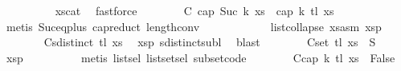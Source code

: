 \begin{isabellebody}
\ \ \ \ \ \ \ \ \isamarkupfalse%
\ xs{\isacharunderscore}{\kern0pt}cat\ \isamarkupfalse%
\ fastforce\isanewline
\ \ \ \ \ \ \isamarkupfalse%
\ C{}{\isacharcolon}{\kern0pt}\ {\isachardoublequoteopen}cap\ {\isacharparenleft}{\kern0pt}Suc\ {\isacharparenleft}{\kern0pt}k{\isacharplus}{\kern0pt}{}{\isacharparenright}{\kern0pt}{\isacharparenright}{\kern0pt}\ xs{}\ {\isasymLongrightarrow}\ cap\ {\isacharparenleft}{\kern0pt}k{\isacharplus}{\kern0pt}{}{\isacharparenright}{\kern0pt}\ {\isacharparenleft}{\kern0pt}tl\ xs{}{\isacharparenright}{\kern0pt}{\isachardoublequoteclose}\isanewline
\ \ \ \ \ \ \ \ \isamarkupfalse%
\ {\isacharparenleft}{\kern0pt}metis\ Suc{\isacharunderscore}{\kern0pt}eq{\isacharunderscore}{\kern0pt}plus{}\ cap{\isacharunderscore}{\kern0pt}reduct\ length{\isacharunderscore}{\kern0pt}{}{\isacharunderscore}{\kern0pt}conv\isanewline
\ \ \ \ \ \ \ \ \ \ \ \ list{\isachardot}{\kern0pt}collapse\ xs{}asm\ xs{}p{}{\isacharparenright}{\kern0pt}\isanewline
\isanewline
\ \ \ \ \ \ \isamarkupfalse%
\ C{}{\isacharcolon}{\kern0pt}{\isachardoublequoteopen}sdistinct\ {\isacharparenleft}{\kern0pt}tl\ xs{}{\isacharparenright}{\kern0pt}{\isachardoublequoteclose}\ \isamarkupfalse%
\ xs{}p{}\ sdistinct{\isacharunderscore}{\kern0pt}subl\ \isamarkupfalse%
\ blast\isanewline
\ \ \ \ \ \ \isamarkupfalse%
\ C{}{\isacharcolon}{\kern0pt}{\isachardoublequoteopen}set\ {\isacharparenleft}{\kern0pt}tl\ xs{}{\isacharparenright}{\kern0pt}\ {\isasymsubseteq}\ S{}{\isachardoublequoteclose}\ \isamarkupfalse%
\ xs{}p{}\isanewline
\ \ \ \ \ \ \ \ \isamarkupfalse%
\ {\isacharparenleft}{\kern0pt}metis\ list{\isachardot}{\kern0pt}sel{\isacharparenleft}{\kern0pt}{}{\isacharparenright}{\kern0pt}\ list{\isachardot}{\kern0pt}set{\isacharunderscore}{\kern0pt}sel{\isacharparenleft}{\kern0pt}{}{\isacharparenright}{\kern0pt}\ subset{\isacharunderscore}{\kern0pt}code{\isacharparenleft}{\kern0pt}{}{\isacharparenright}{\kern0pt}{\isacharparenright}{\kern0pt}\isanewline
\ \ \ \ \ \ \isamarkupfalse%
\ C{}{\isacharcolon}{\kern0pt}{\isachardoublequoteopen}cap\ {\isacharparenleft}{\kern0pt}k{\isacharplus}{\kern0pt}{}{\isacharparenright}{\kern0pt}\ {\isacharparenleft}{\kern0pt}tl\ xs{}{\isacharparenright}{\kern0pt}\ {\isasymLongrightarrow}\ False{\isachardoublequoteclose}\ \isamarkupfalse%

\end{isabellebody}
